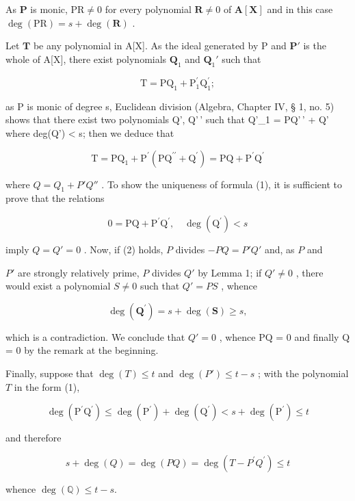 As \(\mathbf{P}\) is monic, \(\mathrm{PR} \neq 0\) for every polynomial \(\mathbf{R} \neq 0\) of \(\mathbf{A}[\mathbf{X}]\) and in this case \(\deg(\mathrm{PR}) = s + \deg(\mathbf{R})\) .

Let \(\mathbf{T}\) be any polynomial in A{[}X{]}. As the ideal generated by P and \(\mathbf{P}'\) is the whole of A{[}X{]}, there exist polynomials \(\mathbf{Q}_1\) and \(\mathbf{Q}_1'\) such that

\[
\mathrm{T} = \mathrm{PQ} _ {1} + \mathrm{P} _ {1} ^ {\prime} \mathrm{Q} _ {1} ^ {\prime};
\]

as P is monic of degree s, Euclidean division (Algebra, Chapter IV, § 1, no. 5) shows that there exist two polynomials Q', Q'\,' such that Q'\_1 = PQ'\,' + Q' where deg(Q') \textless{} s; then we deduce that

\[
\mathrm{T} = \mathrm{PQ} _ {1} + \mathrm{P} ^ {\prime} (\mathrm{PQ} ^ {\prime \prime} + \mathrm{Q} ^ {\prime}) = \mathrm{PQ} + \mathrm{P} ^ {\prime} \mathrm{Q} ^ {\prime}
\]

where \(Q = Q_{1} + P'Q''\) . To show the uniqueness of formula (1), it is sufficient to prove that the relations

\[
0 = \mathrm{PQ} + \mathrm{P} ^ {\prime} \mathrm{Q} ^ {\prime}, \quad \deg (\mathrm{Q} ^ {\prime}) <   s\tag{2}
\]

imply \(Q = Q' = 0\) . Now, if (2) holds, \(P\) divides \(-PQ = P'Q'\) and, as \(P\) and

\(P'\) are strongly relatively prime, \(P\) divides \(Q'\) by Lemma 1; if \(Q' \neq 0\) , there would exist a polynomial \(S \neq 0\) such that \(Q' = PS\) , whence

\[
\deg (\mathbf {Q} ^ {\prime}) = s + \deg (\mathbf {S}) \geqslant s,
\]

which is a contradiction. We conclude that \(Q' = 0\) , whence PQ = 0 and finally Q = 0 by the remark at the beginning.

Finally, suppose that \(\deg(T) \leqslant t\) and \(\deg(P') \leqslant t - s\) ; with the polynomial \(T\) in the form (1),

\[
\deg (\mathrm{P} ^ {\prime} \mathrm{Q} ^ {\prime}) \leqslant \deg (\mathrm{P} ^ {\prime}) + \deg (\mathrm{Q} ^ {\prime}) <   s + \deg (\mathrm{P} ^ {\prime}) \leqslant t
\]

and therefore

\[
s + \deg (Q) = \deg (P Q) = \deg (T - P ^ {\prime} Q ^ {\prime}) \leqslant t
\]

whence \(\deg (\mathbb{Q})\leqslant t - s.\)

